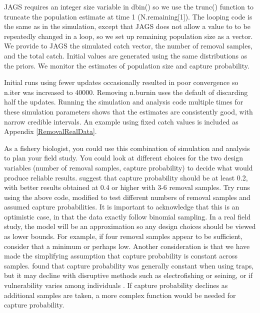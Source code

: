 \documentclass[
]{krantz}
\begin{document}
JAGS requires an integer size variable in dbin() so we use the trunc() function to truncate the population estimate at time 1 (N.remaining{[}1{]}). The looping code is the same as in the simulation, except that JAGS does not allow a value to to be repeatedly changed in a loop, so we set up remaining population size as a vector. We provide to JAGS the simulated catch vector, the number of removal samples, and the total catch. Initial values are generated using the same distributions as the priors. We monitor the estimates of population size and capture probability.

Initial runs using fewer updates occasionally resulted in poor convergence so n.iter was increased to 40000. Removing n.burnin uses the default of discarding half the updates. Running the simulation and analysis code multiple times for these simulation parameters shows that the estimates are consistently good, with narrow credible intervals. An example using fixed catch values is included as Appendix \ref{RemovalRealData}.

As a fishery biologist, you could use this combination of simulation and analysis to plan your field study. You could look at different choices for the two design variables (number of removal samples, capture probability) to decide what would produce reliable results. \citet{white.etal_1982} suggest that capture probability should be at least 0.2, with better results obtained at 0.4 or higher with 3-6 removal samples. Try runs using the above code, modified to test different numbers of removal samples and assumed capture probabilities. It is important to acknowledge that this is an optimistic case, in that the data exactly follow binomial sampling. In a real field study, the model will be an approximation so any design choices should be viewed as lower bounds. For example, if four removal samples appear to be sufficient, consider that a minimum or perhaps low. Another consideration is that we have made the simplifying assumption that capture probability is constant across samples. \citet{bryant_2000} found that capture probability was generally constant when using traps, but it may decline with disruptive methods such as electrofishing or seining, or if vulnerability varies among individuals \citep{mantyniemi.etal2005}. If capture probability declines as additional samples are taken, a more complex function would be needed for capture probability.
\end{document}
